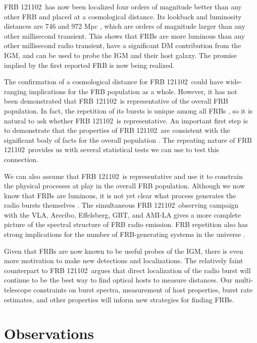 \documentclass[twocolumn]{aastex61}
\newcommand{\frb}{FRB 121102}
\begin{document}
\frb\ has now been localized four orders of magnitude better than any other FRB and placed at a cosmological distance. Its lookback and luminosity distances are 746 and 972 Mpc \citep{2016A&A...594A..13P}, which are orders of magnitude larger than any other millisecond transient. This shows that FRBs are more luminous than any other millisecond radio transient, have a significant DM contribution from the IGM, and can be used to probe the IGM and their host galaxy. The promise implied by the first reported FRB \citep{2007Sci...318..777L} is now being realized.

The confirmation of a cosmological distance for \frb\ could have wide-ranging implications for the FRB population as a whole. However, it has not been demonstrated that \frb\ is representative of the overall FRB population. In fact, the repetition of its bursts is unique among all FRBs \citep{2015MNRAS.454..457P}, so it is natural to ask whether \frb\ is representative. An important first step is to demonstrate that the properties of \frb\ are consistent with the significant body of facts for the overall population \citep{2015MNRAS.451.3278M, 2016MPLA...3130013K}. The repeating nature of \frb\ provides us with several statistical tests we can use to test this connection.

We can also assume that \frb\ is representative and use it to constrain the physical processes at play in the overall FRB population. Although we now know that FRBs are luminous, it is not yet clear what process generates the radio bursts themselves \citep{2014PhRvD..89j3009K, 2014ApJ...785L..26L, 2016MNRAS.457..232C}. The simultaneous \frb\ observing campaign with the VLA, Arecibo, Effelsberg, GBT, and AMI-LA gives a more complete picture of the spectral structure of FRB radio emission. FRB repetition also has strong implications for the number of FRB-generating systems in the universe \citep{2016MNRAS.458L..89C}.

Given that FRBs are now known to be useful probes of the IGM, there is even more motivation to make new detections and localizations. The relatively faint counterpart to \frb\ argues that direct localization of the radio burst will continue to be the best way to find optical hosts to measure distances. Our multi-telescope constraints on burst spectra, measurement of host properties, burst rate estimates, and other properties will inform new strategies for finding FRBs.

\section{Observations}
\end{document}
